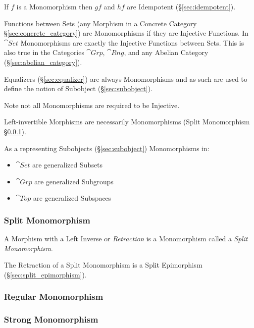 If $f$ is a Monomorphism then $gf$ and $hf$ are Idempotent
(\S\ref{sec:idempotent}). %

Functions between Sets (any Morphism in a Concrete Category
\S\ref{sec:concrete_category}) are Monomorphisms if they are Injective
Functions. In $\cat{Set}$ Monomorphisms are exactly the Injective
Functions between Sets. This is also true in the Categories
$\cat{Grp}$, $\cat{Rng}$, and any Abelian Category
(\S\ref{sec:abelian_category}).

Equalizers (\S\ref{sec:equalizer}) are always Monomorphisms and as
such are used to define the notion of Subobject
(\S\ref{sec:subobject}).

\fist Note not all Monomorphisms are required to be Injective.

Left-invertible Morphisms are necessarily Monomorphisms (Split
Monomorphism \S\ref{sec:split_monomorphism}).

As a representing Subobjects (\S\ref{sec:subobject}) Monomorphisms in:
\begin{itemize}
  \item $\cat{Set}$ are generalized Subsets
  \item $\cat{Grp}$ are generalized Subgroups
  \item $\cat{Top}$ are generalized Subspaces
\end{itemize}



\subsubsection{Split Monomorphism}\label{sec:split_monomorphism}

A Morphism with a Left Inverse or \emph{Retraction} is a Monomorphism
called a \emph{Split Monomorphism}.

The Retraction of a Split Monomorphism is a Split Epimorphism
(\S\ref{sec:split_epimorphism}).



\subsubsection{Regular Monomorphism}\label{sec:regular_monomorphism}

\subsubsection{Strong Monomorphism}\label{sec:strong_monomorphism}

